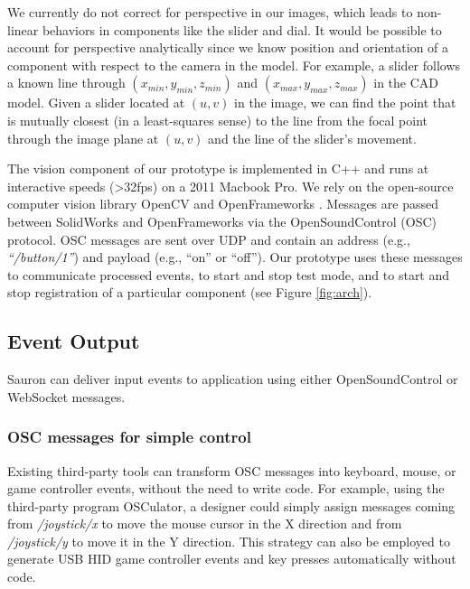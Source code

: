We currently do not correct for perspective in our images, which leads to non-linear behaviors in components like the slider and dial. It would be possible to account for perspective analytically since we know position and orientation of a component with respect to the camera in the model. For example, a slider follows a known line through $(x_{min}, y_{min},z_{min})$ and $(x_{max},y_{max},z_{max})$   in the CAD model.
Given a slider located at $(u,v)$ in the image, we can find the point that is mutually closest (in a least-squares sense) to the line from the focal point through the image plane at $(u,v)$ and the line of the slider's movement.

The vision component of our prototype is implemented in C++ and runs at interactive speeds (\textgreater 32fps) on a 2011 Macbook Pro. We rely on the open-source computer vision library OpenCV \cite{opencv} and OpenFrameworks \cite{openframeworks}.
Messages are passed between SolidWorks and OpenFrameworks via the OpenSoundControl (OSC) protocol. OSC messages are sent over UDP and contain an address (e.g., {\em ``/button/1''}) and payload (e.g., ``on'' or ``off''). Our prototype uses these messages to communicate processed events, to start and stop test mode, and to start and stop registration of a particular component (see Figure \ref{fig:arch}).


\subsection{Event Output}
Sauron can deliver input events to application using either OpenSoundControl or WebSocket messages.

\subsubsection{OSC messages for simple control}

Existing third-party tools can transform OSC messages into keyboard, mouse, or game controller events, without the need to write code. For example, using the third-party program OSCulator, a designer could simply assign messages coming from {\em /joystick/x} to move the mouse cursor in the X direction and from {\em /joystick/y} to move it in the Y direction. This strategy can also be employed to generate USB HID game controller events and key presses automatically without code.

